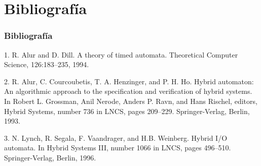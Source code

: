 \documentclass{beamer}
\begin{document}
\section{Bibliografía}

\begin{frame}
\frametitle{Bibliografía}

\tiny{
1. R. Alur and D. Dill.  A theory of timed automata. Theoretical  Computer Science,
126:183–235, 1994. \newline

2. R. Alur, C. Courcoubetis, T. A. Henzinger, and P. H. Ho. Hybrid automaton: An algorithmic approach to the specification and verification of hybrid systems. In Robert L. Grossman, Anil Nerode, Anders P. Ravn, and Hans Rischel, editors, Hybrid Systems, number 736 in LNCS, pages 209–229. Springer-Verlag, Berlin, 1993. \newline

3.  N. Lynch, R. Segala, F. Vaandrager, and H.B. Weinberg.  Hybrid I/O automata.  In
Hybrid Systems III, number 1066 in LNCS, pages 496–510. Springer-Verlag, Berlin, 1996. \newline}

\end{frame}
\end{document}
